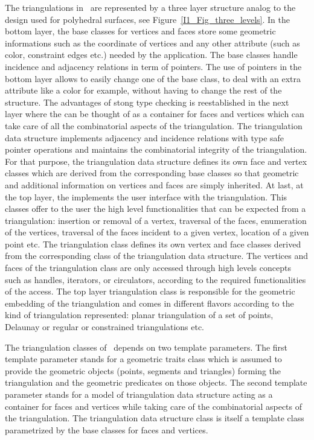 The triangulations in \cgal\ are represented
by a three layer structure  analog to the design used for polyhedral
surfaces, see Figure~\ref{I1_Fig_three_levels}.
In the bottom layer, the base classes for vertices and faces
store some 
geometric informations such as the coordinate of vertices 
and any other attribute (such as color, constraint edges etc.)
needed by the application.
The base classes handle
incidence and adjacency relations in term of  pointers.
The use of  pointers in the bottom layer allows 
to easily change one of the base
class, to deal with an extra attribute like a color for example,
without having to change the rest of the structure. 
The advantages of stong type 
checking is reestablished in the next layer 
where the  can be thought 
of as a container for faces and vertices which can take care
of all the combinatorial aspects of the triangulation.
The {triangulation data structure}
implements
adjacency and incidence relations with type safe pointer operations
and maintains the combinatorial integrity of the triangulation.
For that purpose, the {triangulation data structure} defines its own face and vertex
classes which are derived
 from the corresponding 
base classes
so that geometric and additional information on vertices and faces 
are simply inherited.
  At last, at the top layer, the 
implements the user interface with the triangulation. 
This classes offer to the user
the high level functionalities that can be expected from a triangulation:
insertion  or removal of a vertex, traversal of the faces,
enumeration of the vertices,
traversal of the   faces incident to a given vertex, location of a given point etc.
The {triangulation class} defines its own 
vertex and face classes
derived from the corresponding class of the {triangulation data structure}.
The vertices and faces of the {triangulation class}
are only accessed through high levels concepts such as 
handles, iterators, or circulators,
according to the required functionalities of the access.
The top layer {triangulation class}
is responsible for the geometric embedding of the triangulation
and comes in different flavors according to the kind of triangulation represented:
planar triangulation of a set of points, Delaunay or regular or constrained
 triangulations etc.

The triangulation classes of \cgal\ depends on two template parameters.
The first template parameter stands for
 a geometric traits class which is assumed to provide
the geometric objects (points, segments and triangles) 
forming  the triangulation and the geometric predicates on those objects.
The second template parameter stands for a model
of  triangulation data
structure acting as a container for faces and vertices
while  taking care of the combinatorial aspects of the triangulation. 
The triangulation data structure class is itself a template
class parametrized by the base classes for faces and vertices.


